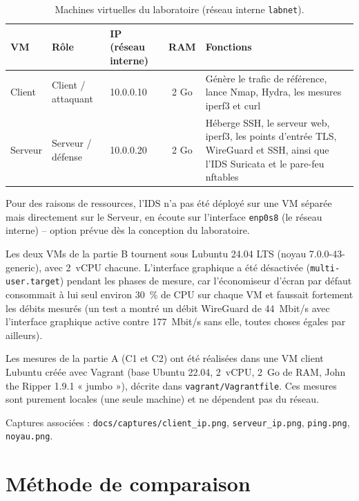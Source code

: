 \documentclass[11pt,a4paper]{article}
\newcommand{\fic}[1]{\texttt{#1}}
\begin{document}
\begin{table}[H]
\centering
\begin{tabularx}{\textwidth}{l l l c Y}
\toprule
\textbf{VM} & \textbf{Rôle} & \textbf{IP (réseau interne)} & \textbf{RAM} & \textbf{Fonctions} \\
\midrule
Client & Client / attaquant & 10.0.0.10 & 2 Go & Génère le trafic de référence, lance Nmap, Hydra, les mesures iperf3 et curl \\
Serveur & Serveur / défense & 10.0.0.20 & 2 Go & Héberge SSH, le serveur web, iperf3, les points d'entrée TLS, WireGuard et SSH, ainsi que l'IDS Suricata et le pare-feu nftables \\
\bottomrule
\end{tabularx}
\caption{Machines virtuelles du laboratoire (réseau interne \texttt{labnet}).}
\end{table}

Pour des raisons de ressources, l'IDS n'a pas été déployé sur une VM séparée mais directement
sur le Serveur, en écoute sur l'interface \texttt{enp0s8} (le réseau interne) -- option prévue
dès la conception du laboratoire.

Les deux VMs de la partie B tournent sous Lubuntu 24.04 LTS (noyau 7.0.0-43-generic), avec
2~vCPU chacune. L'interface graphique a été désactivée (\texttt{multi-user.target}) pendant les
phases de mesure, car l'économiseur d'écran par défaut consommait à lui seul environ 30~\% de
CPU sur chaque VM et faussait fortement les débits mesurés (un test a montré un débit
WireGuard de 44~Mbit/s avec l'interface graphique active contre 177~Mbit/s sans elle, toutes
choses égales par ailleurs).

Les mesures de la partie A (C1 et C2) ont été réalisées dans une VM client Lubuntu créée avec
Vagrant (base Ubuntu 22.04, 2~vCPU, 2~Go de RAM, John the Ripper 1.9.1 « jumbo »), décrite dans
\fic{vagrant/Vagrantfile}. Ces mesures sont purement locales (une seule machine) et ne
dépendent pas du réseau.

Captures associées : \fic{docs/captures/client\_ip.png}, \fic{serveur\_ip.png}, \fic{ping.png},
\fic{noyau.png}.

\section{Méthode de comparaison}
\end{document}
